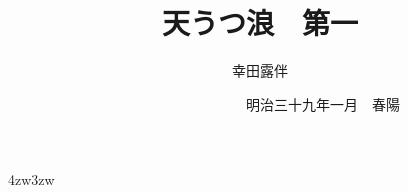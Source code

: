 \documentclass[dvipdfmx,uplatex,tate,book,paper=a5paper,jafontsize=13pt,
    open_bracket_pos=nibu_tentsuki,hanging_punctuation]{jlreq}
\title{\Huge 天うつ浪　{\Large 第一}}
\author{幸田露伴}
\date{　　　　　　　　　{\small 明治三十九年一月}　春陽{\換字{堂}}}
\newcommand{\詰めruby}[2]{\ruby[g]{#1}{{\kanjiskip=0pt plus 0pt minus 0pt #2}}}
\begin{document}
\maketitle
\pagestyle{myheadings}
\newcommand{\Entry}[1]{
	\section*{#1}
	\markboth{#1}{#1}
	\setcounter{equation}{0}}
\begin{indentation}{4zw}{3zw}
\parindent=0pt

\newpage
\　%
\newpage










































\end{indentation}
\end{document}
